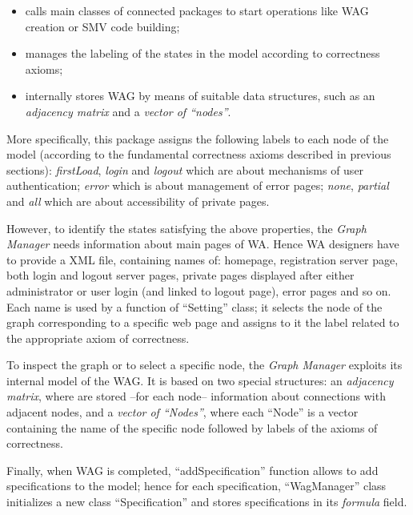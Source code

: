 \footnotesize
\begin{itemize}
	\item calls main classes of connected packages to start operations like WAG creation or SMV code building;
	\item	manages the labeling of the states in the model according to correctness axioms;
	\item	internally stores WAG by means of suitable data structures, such as an \textit{adjacency matrix} and a \textit{vector of ``nodes''}.
\end{itemize}

\normalsize
More specifically, this package assigns the following labels to each node of the model (according to the fundamental correctness axioms described in previous sections): \textit{firstLoad}, \textit{login} and \textit{logout} which are about mechanisms of user authentication; \textit{error} which is about management of error pages; \textit{none}, \textit{partial} and \textit{all} which are about accessibility of private pages. 

However, to identify the states satisfying the above properties, the \textit{Graph Manager} needs information about main pages of WA. Hence WA designers have to provide a XML file, containing names of: homepage,	registration server page, both login and logout server pages, private pages displayed after either administrator or user login (and linked to logout page), error pages and so on. Each name is used by a function of ``Setting'' class; it selects the node of the graph corresponding to a specific web page and assigns to it the label related to the appropriate axiom of correctness.  

To inspect the graph or to select a specific node, the \textit{Graph Manager} exploits its internal model of the WAG. It is based on two special structures: an \textit{adjacency matrix}, where are stored --for each node-- information about connections with adjacent nodes, and a \textit{vector of ``Nodes''}, where each ``Node'' is a vector containing the name of the specific node followed by labels of the axioms of correctness.

Finally, when WAG is completed, ``addSpecification'' function allows to add \ctl specifications to the model; hence for each specification, ``WagManager'' class initializes a new class ``Specification'' and stores \ctl specifications in its \textit{formula} field.


